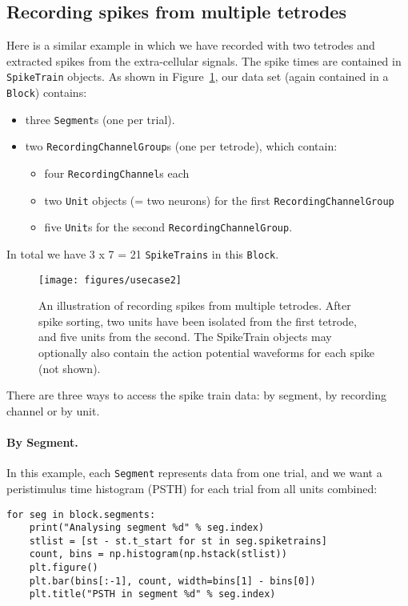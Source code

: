 \documentclass{frontiers}
\begin{document}
\subsection{Recording spikes from multiple tetrodes}

Here is a similar example in which we have recorded with two tetrodes and extracted spikes from the extra-cellular signals. The spike times are contained in \lstinline`SpikeTrain` objects. As shown in Figure~\ref{fig:usecase2}, our data set (again contained in a \lstinline`Block`) contains:

\begin{itemize}
\item three \lstinline`Segment`s (one per trial).
\item two \lstinline`RecordingChannelGroup`s (one per tetrode), which contain:
  \begin{itemize}
  \item four \lstinline`RecordingChannel`s each
  \item two \lstinline`Unit` objects (= two neurons) for the first \lstinline`RecordingChannelGroup`
  \item five \lstinline`Unit`s for the second \lstinline`RecordingChannelGroup`.
  \end{itemize}
\end{itemize}

In total we have 3 x 7 = 21 \lstinline`SpikeTrains` in this \lstinline`Block`.

\begin{figure}
\centering
\texttt{[image: figures/usecase2]}
\caption{An illustration of recording spikes from multiple tetrodes. After spike sorting, two units have been isolated from the first tetrode, and five units from the second. The SpikeTrain objects may optionally also contain the action potential waveforms for each spike (not shown).
}\label{fig:usecase2} 
\end{figure}

There are three ways to access the spike train data: by segment, by recording channel or by unit.

\paragraph{By Segment.}
In this example, each \lstinline`Segment` represents data from one trial, and we want a peristimulus time histogram (PSTH) for each trial from all units combined:

\begin{lstlisting}[style=display]
for seg in block.segments:
    print("Analysing segment %d" % seg.index)
    stlist = [st - st.t_start for st in seg.spiketrains]
    count, bins = np.histogram(np.hstack(stlist))
    plt.figure()
    plt.bar(bins[:-1], count, width=bins[1] - bins[0])
    plt.title("PSTH in segment %d" % seg.index)
\end{lstlisting}
\end{document}
